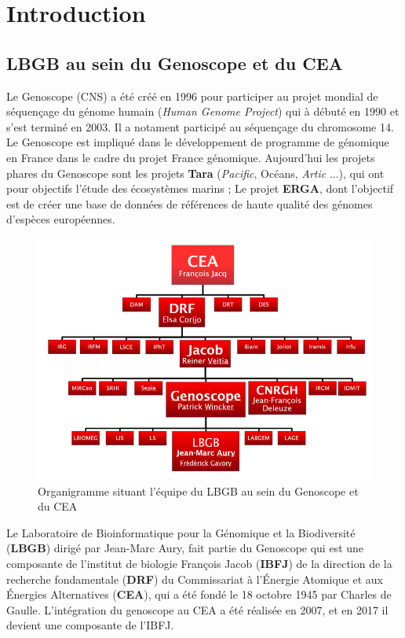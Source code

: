 \section{Introduction}
\subsection{LBGB au sein du Genoscope et du CEA}
Le Genoscope (CNS) a été créé en 1996 pour participer au projet mondial de séquençage du génome humain (\emph{Human Genome Project}) qui à débuté en 1990 et s'est terminé en 2003. Il a notament participé au séquençage du chromosome 14. Le Genoscope est impliqué dans le développement de programme de génomique en France dans le cadre du projet France génomique. Aujourd'hui les projets phares du Genoscope sont les projets \textbf{Tara} (\emph{Pacific}, Océans, \emph{Artic} ...), qui ont pour objectifs l'étude des écosystèmes marins ; Le projet \textbf{ERGA}, dont l'objectif est de créer une base de données de références de haute qualité des génomes d'espèces européennes.\\

\begin{minipage}{0.40\textwidth}
\begin{figure}[H]
    \centering
    \includegraphics[width=1\textwidth]{img/organigramme.png}
    \caption{Organigramme situant l’équipe du LBGB au sein du Genoscope et du CEA}
    \label{organigramme_LBGB}
\end{figure}
\end{minipage} 
\hfill
\begin{minipage}{0.5\textwidth}
    Le Laboratoire de Bioinformatique pour la Génomique et la Biodiversité (\textbf{LBGB}) dirigé par Jean-Marc Aury, fait partie du Genoscope qui est une composante de l'institut de biologie François Jacob (\textbf{IBFJ}) de la direction de la recherche fondamentale (\textbf{DRF}) du Commissariat à l'Énergie Atomique et aux Énergies Alternatives (\textbf{CEA}), qui a été fondé le 18 octobre 1945 par Charles de Gaulle. L'intégration du genoscope au CEA a été réalisée en 2007, et en 2017 il devient une composante de l'IBFJ.
\end{minipage}


